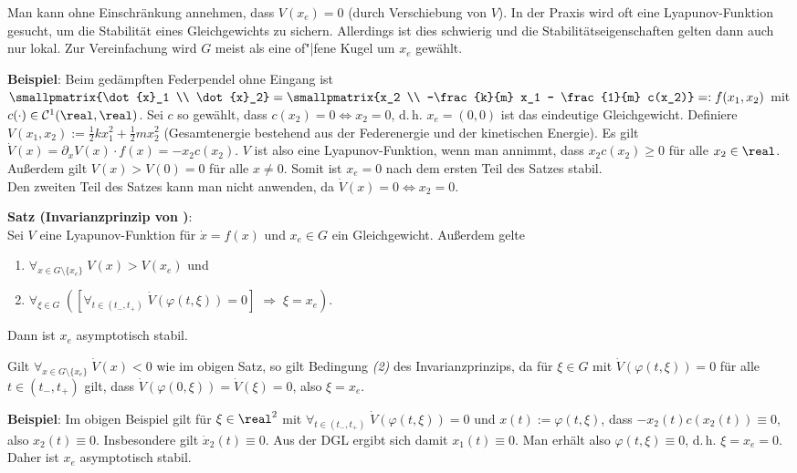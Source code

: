 Man kann ohne Einschränkung annehmen, dass $V(x_e) = 0$ (durch Verschiebung von $V$).
In der Praxis wird oft eine Lyapunov-Funktion gesucht, um die Stabilität eines Gleichgewichts
zu sichern.
Allerdings ist dies schwierig und die Stabilitätseigenschaften gelten dann auch nur lokal.
Zur Vereinfachung wird $G$ meist als eine of"|fene Kugel um $x_e$ gewählt.

\textbf{Beispiel}:
Beim gedämpften Federpendel ohne Eingang ist
$\smallpmatrix{\dot{x}_1 \\ \dot{x}_2} =
\smallpmatrix{x_2 \\ -\frac{k}{m} x_1 - \frac{1}{m} c(x_2)}
=: f(x_1, x_2)$ mit $c(\cdot) \in \C^1(\real, \real)$.
Sei $c$ so gewählt, dass $c(x_2) = 0 \iff x_2 = 0$,
d.\,h. $x_e = (0, 0)$ ist das eindeutige Gleichgewicht.
Definiere $V(x_1, x_2) := \frac{1}{2} kx_1^2 + \frac{1}{2} mx_2^2$
(Gesamtenergie bestehend aus der Federenergie und der kinetischen Energie).
Es gilt $\dot{V}(x) = \partial_x V(x) \cdot f(x) = -x_2 c(x_2)$.
$V$ ist also eine Lyapunov-Funktion,
wenn man annimmt, dass $x_2 c(x_2) \ge 0$ für alle $x_2 \in \real$.
Außerdem gilt $V(x) > V(0) = 0$ für alle $x \not= 0$.
Somit ist $x_e = 0$ nach dem ersten Teil des Satzes stabil.\\
Den zweiten Teil des Satzes kann man nicht anwenden, da $\dot{V}(x) = 0 \iff x_2 = 0$.

\linie

\textbf{Satz (Invarianzprinzip von )}:\\
Sei $V$ eine Lyapunov-Funktion für $\dot{x} = f(x)$ und $x_e \in G$ ein Gleichgewicht.
Außerdem gelte
\begin{enumerate}
    \item
    $\forall_{x \in G \setminus \{x_e\}}\; V(x) > V(x_e)$ und

    \item
    $\forall_{\xi \in G}\;
    ([\forall_{t \in (t_-, t_+)}\; \dot{V}(\varphi(t, \xi)) = 0] \;\Rightarrow\;
    \xi = x_e)$.
\end{enumerate}
Dann ist $x_e$ asymptotisch stabil.

Gilt $\forall_{x \in G \setminus \{x_e\}}\; \dot{V}(x) < 0$ wie im obigen Satz,
so gilt Bedingung \emph{(2)} des Invarianzprinzips, da für $\xi \in G$ mit
$\dot{V}(\varphi(t, \xi)) = 0$ für alle $t \in (t_-, t_+)$ gilt, dass
$\dot{V}(\varphi(0, \xi)) = \dot{V}(\xi) = 0$, also $\xi = x_e$.

\linie
\pagebreak

\textbf{Beispiel}:
Im obigen Beispiel gilt für $\xi \in \real^2$ mit
$\forall_{t \in (t_-, t_+)}\; \dot{V}(\varphi(t, \xi)) = 0$ und $x(t) := \varphi(t, \xi)$, dass
$-x_2(t) c(x_2(t)) \equiv 0$, also $x_2(t) \equiv 0$.
Insbesondere gilt $\dot{x}_2(t) \equiv 0$.
Aus der DGL ergibt sich damit $x_1(t) \equiv 0$.
Man erhält also $\varphi(t, \xi) \equiv 0$, d.\,h. $\xi = x_e = 0$.
Daher ist $x_e$ asymptotisch stabil.

